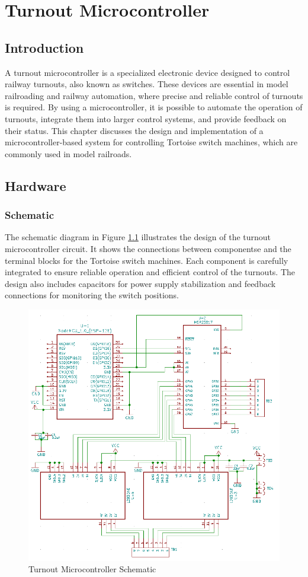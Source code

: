 \chapter{Turnout Microcontroller}
\section{Introduction}
A turnout microcontroller is a specialized electronic device designed to control railway turnouts, also known as switches. These devices are essential in model railroading and railway automation, where precise and reliable control
of turnouts is required. By using a microcontroller, it is possible to automate the operation of turnouts, integrate them into larger control systems, and provide feedback on their status. This chapter discusses the design and
implementation of a microcontroller-based system for controlling Tortoise switch machines, which are commonly used in model railroads.
\section{Hardware}
\subsection{Schematic}
The schematic diagram in Figure \ref{fig:turnout-schematic} illustrates the design of the turnout microcontroller circuit. It shows the connections between componentse and the terminal blocks for the Tortoise switch machines. 
Each component is carefully integrated to ensure reliable operation and efficient control of the turnouts. The design also includes capacitors for power supply stabilization and feedback connections for monitoring the switch positions.

\begin{figure}[H]
  \centering
    \includegraphics[scale=0.45]{../Images/turnout_schematic.png}
  \caption{Turnout Microcontroller Schematic}
  \label{fig:turnout-schematic}
\end{figure}

